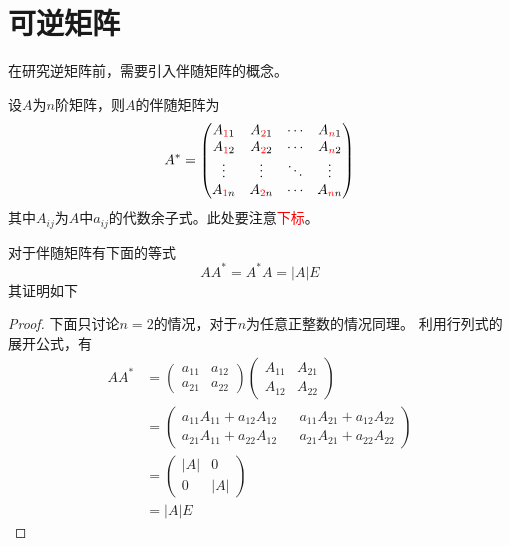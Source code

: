 \section{可逆矩阵}
在研究逆矩阵前，需要引入伴随矩阵的概念。
\begin{definition}
    设$A$为$n$阶矩阵，则$A$的伴随矩阵为
    \[
        A^* =
        \begin{pmatrix}
            A_{\textcolor{red}{1}1} & A_{\textcolor{red}{2}1} & \cdots & A_{\textcolor{red}{n}1} \\
            A_{\textcolor{red}{1}2} & A_{\textcolor{red}{2}2} & \cdots & A_{\textcolor{red}{n}2} \\
            \vdots                  & \vdots                  & \ddots & \vdots                  \\
            A_{\textcolor{red}{1}n} & A_{\textcolor{red}{2}n} & \cdots & A_{\textcolor{red}{n}n} \\
        \end{pmatrix}
    \]
    其中$A_{ij}$为$A$中$a_{ij}$的代数余子式。此处要注意\textcolor{red}{下标}。
\end{definition}
对于伴随矩阵有下面的等式
\begin{equation}
    AA^* = A^*A = |A|E
\end{equation}
其证明如下
\begin{proof}
    下面只讨论$n=2$的情况，对于$n$为任意正整数的情况同理。
    利用行列式的展开公式，有
    \begin{align*}
        AA^* & =
        \begin{pmatrix}
            a_{11} & a_{12} \\
            a_{21} & a_{22}
        \end{pmatrix}
        \begin{pmatrix}
            A_{11} & A_{21} \\
            A_{12} & A_{22}
        \end{pmatrix} \\
             & =
        \begin{pmatrix}
            a_{11}A_{11} + a_{12}A_{12} &  & a_{11}A_{21} + a_{12}A_{22} \\
            a_{21}A_{11} + a_{22}A_{12} &  & a_{21}A_{21} + a_{22}A_{22}
        \end{pmatrix} \\
             & =
        \begin{pmatrix}
            |A| & 0   \\
            0   & |A|
        \end{pmatrix} \\
             & = |A|E
    \end{align*}
\end{proof}

